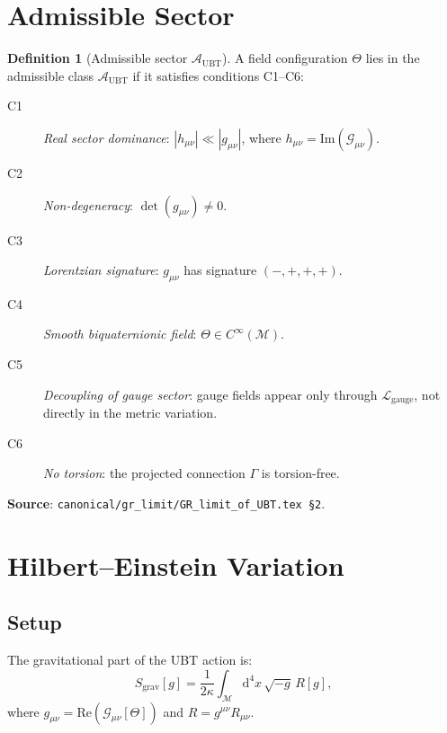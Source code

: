 \documentclass[11pt,a4paper]{article}
\theoremstyle{definition}
\newtheorem{definition}[theorem]{Definition}
\theoremstyle{remark}
\begin{document}
\section{Admissible Sector}\label{sec:admissible}

\begin{definition}[Admissible sector $\mathcal{A}_{\mathrm{UBT}}$]
\label{def:admissible}
A field configuration $\Theta$ lies in the admissible class
$\mathcal{A}_{\mathrm{UBT}}$ if it satisfies conditions C1--C6:
\begin{description}
  \item[C1] \textit{Real sector dominance}: $|h_{\mu\nu}| \ll |g_{\mu\nu}|$,
    where $h_{\mu\nu} = \mathrm{Im}(\mathcal{G}_{\mu\nu})$.
  \item[C2] \textit{Non-degeneracy}: $\det(g_{\mu\nu}) \neq 0$.
  \item[C3] \textit{Lorentzian signature}: $g_{\mu\nu}$ has signature
    $(-,+,+,+)$.
  \item[C4] \textit{Smooth biquaternionic field}: $\Theta \in C^\infty(\mathcal{M})$.
  \item[C5] \textit{Decoupling of gauge sector}: gauge fields appear only
    through $\mathcal{L}_{\mathrm{gauge}}$, not directly in the metric
    variation.
  \item[C6] \textit{No torsion}: the projected connection $\Gamma$ is
    torsion-free.
\end{description}
\end{definition}

\noindent\textbf{Source}: \texttt{canonical/gr\_limit/GR\_limit\_of\_UBT.tex \S2}.

\section{Hilbert--Einstein Variation}\label{sec:hilbert}

\subsection{Setup}

The gravitational part of the UBT action is:
\begin{equation}\label{eq:SEH}
  S_{\mathrm{grav}}[g]
  = \frac{1}{2\kappa}\int_{\mathcal{M}} \mathrm{d}^4x\,\sqrt{-g}\,R[g],
\end{equation}
where $g_{\mu\nu} = \mathrm{Re}(\mathcal{G}_{\mu\nu}[\Theta])$ and
$R = g^{\mu\nu}R_{\mu\nu}$.
\end{document}
